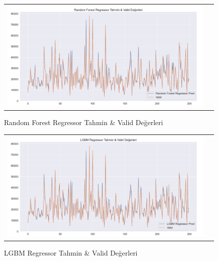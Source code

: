 \documentclass[conference]{IEEEtran}
\begin{document}
\begin{figure}[!h]
	\centering
	\begin{center}
		\begin{tabular}{cc}
			\includegraphics[scale=0.18]{pictures/pic_20.png}&
		\end{tabular}
	\end{center}
	\caption{Random Forest Regressor Tahmin \& Valid Değerleri}
	\label{fig:20}
\end{figure}

\begin{figure}[!h]
	\centering
	\begin{center}
		\begin{tabular}{cc}
			\includegraphics[scale=0.18]{pictures/pic_21.png}&
		\end{tabular}
	\end{center}
	\caption{LGBM Regressor Tahmin \& Valid Değerleri}
	\label{fig:21}
\end{figure}
\end{document}
